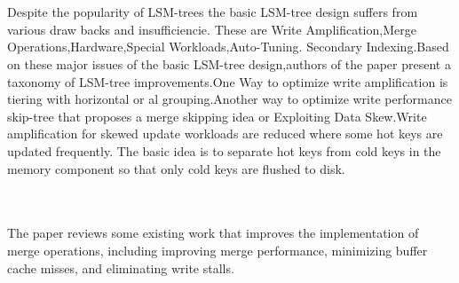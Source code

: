 \documentclass{article}
\begin{document}
\par
\newline
\\
\\
Despite the popularity of LSM-trees
the basic LSM-tree design suffers from various draw backs and insufficiencie.
These are Write Amplification,Merge Operations,Hardware,Special Workloads,Auto-Tuning.
Secondary Indexing.Based on these major issues of the basic LSM-tree design,authors of the paper present a taxonomy of LSM-tree improvements.One Way to optimize write amplification is tiering with horizontal or al grouping.Another way to optimize  write performance skip-tree that proposes a merge skipping idea or Exploiting Data Skew.Write amplification for skewed update
workloads are reduced  where some hot keys are updated frequently.
The basic idea is to separate hot keys from cold keys in the memory
component so that only cold keys are flushed to disk.
\par
\newline
\\
\\
The paper reviews some existing work that improves the implementation
of merge operations, including improving merge performance, minimizing buffer cache misses, and eliminating write stalls.
\end{document}
